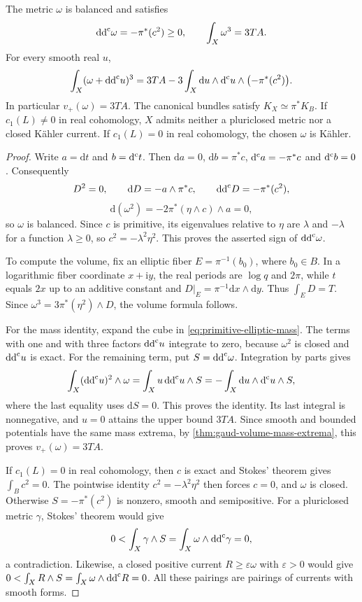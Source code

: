 \begin{proposition}\label{prop:primitive-elliptic-metric}
The metric $\omega$ is balanced and satisfies
\[
 \mathrm{dd}^{\mathrm{c}}\omega=-\pi^*(c^2)\geq0,\qquad
 \int_X\omega^3=3TA.
\]
For every smooth real $u$,
\begin{equation}\label{eq:primitive-elliptic-mass}
 \int_X(\omega+\mathrm{dd}^{\mathrm{c}} u)^3
 =3TA-3\int_X\mathrm{d}u\wedge\mathrm d^{\mathrm c} u\wedge\bigl(-\pi^*(c^2)\bigr).
\end{equation}
In particular $v_+(\omega)=3TA$. The canonical bundles satisfy $K_X\simeq\pi^*K_B$. If $c_1(L)\ne0$ in real cohomology, $X$ admits neither a pluriclosed metric nor a closed K\"ahler current. If $c_1(L)=0$ in real cohomology, the chosen $\omega$ is K\"ahler.
\end{proposition}
\begin{proof}
Write $a=\mathrm{d}t$ and $b=\mathrm d^{\mathrm c} t$. Then $\mathrm{d}a=0$, $\mathrm{d}b=\pi^*c$, $\mathrm d^{\mathrm c} a=-\pi^*c$ and $\mathrm d^{\mathrm c} b=0$. Consequently
\[
 D^2=0,\qquad \mathrm{d}D=-a\wedge\pi^*c,
 \qquad \mathrm{dd}^{\mathrm{c}} D=-\pi^*(c^2),
\]
\[
 \mathrm{d}(\omega^2)=-2\pi^*(\eta\wedge c)\wedge a=0,
\]
so $\omega$ is balanced. Since $c$ is primitive, its eigenvalues relative to $\eta$ are $\lambda$ and $-\lambda$ for a function $\lambda\geq0$, so $c^2=-\lambda^2\eta^2$. This proves the asserted sign of $\mathrm{dd}^{\mathrm{c}}\omega$.

To compute the volume, fix an elliptic fiber $E=\pi^{-1}(b_0)$, where $b_0\in B$. In a logarithmic fiber coordinate $x+\mathrm{i}y$, the real periods are $\log q$ and $2\pi$, while $t$ equals $2x$ up to an additive constant and $D|_E=\pi^{-1}\mathrm{d}x\wedge\mathrm{d}y$. Thus $\int_ED=T$. Since $\omega^3=3\pi^*(\eta^2)\wedge D$, the volume formula follows.

For the mass identity, expand the cube in \eqref{eq:primitive-elliptic-mass}. The terms with one and with three factors $\mathrm{dd}^{\mathrm{c}} u$ integrate to zero, because $\omega^2$ is closed and $\mathrm{dd}^{\mathrm{c}} u$ is exact. For the remaining term, put $S=\mathrm{dd}^{\mathrm{c}}\omega$. Integration by parts gives
\[
 \int_X(\mathrm{dd}^{\mathrm{c}} u)^2\wedge\omega
 =\int_Xu\,\mathrm{dd}^{\mathrm{c}} u\wedge S
 =-\int_X\mathrm{d}u\wedge\mathrm d^{\mathrm c} u\wedge S,
\]
where the last equality uses $\mathrm{d}S=0$. This proves the identity. Its last integral is nonnegative, and $u=0$ attains the upper bound $3TA$. Since smooth and bounded potentials have the same mass extrema, by \cref{thm:gaud-volume-mass-extrema}, this proves $v_+(\omega)=3TA$.

If $c_1(L)=0$ in real cohomology, then $c$ is exact and Stokes' theorem gives $\int_Bc^2=0$. The pointwise identity $c^2=-\lambda^2\eta^2$ then forces $c=0$, and $\omega$ is closed. Otherwise $S=-\pi^*(c^2)$ is nonzero, smooth and semipositive. For a pluriclosed metric $\gamma$, Stokes' theorem would give
\[
 0<\int_X\gamma\wedge S
 =\int_X\omega\wedge\mathrm{dd}^{\mathrm{c}}\gamma=0,
\]
a contradiction. Likewise, a closed positive current $R\geq\varepsilon\omega$ with $\varepsilon>0$ would give $0<\int_XR\wedge S=\int_X\omega\wedge\mathrm{dd}^{\mathrm{c}} R=0$. All these pairings are pairings of currents with smooth forms.


\end{proof}
